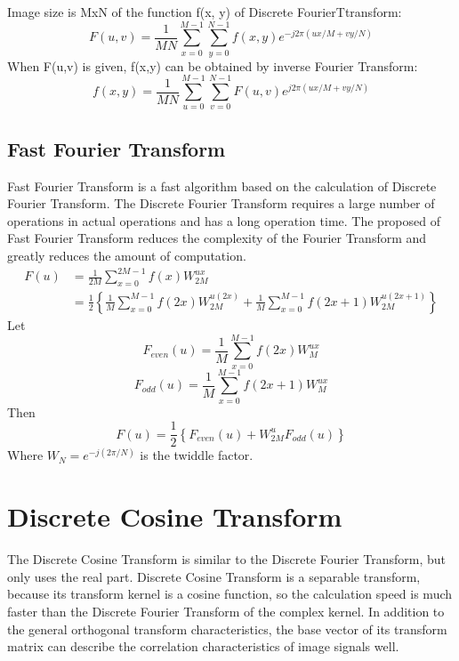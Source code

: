Image size is MxN of the function f(x, y) of Discrete FourierTtransform:
\begin{equation}
F(u,v) = \frac{1}{MN} \sum_{x=0}^{M-1} \sum_{y=0}^{N-1} f(x,y) e^{-j2\pi (ux/M + vy/N)}
\label{eq:2-8}
\end{equation}
When F(u,v) is given, f(x,y) can be obtained by inverse Fourier Transform:
\begin{equation}
f(x,y) = \frac{1}{MN} \sum_{u=0}^{M-1} \sum_{v=0}^{N-1} F(u,v) e^{j2\pi (ux/M + vy/N)}
\label{eq:2-9}
\end{equation}
\subsection{Fast Fourier Transform}
Fast Fourier Transform is a fast algorithm based on the calculation of Discrete Fourier Transform. The Discrete Fourier Transform requires a large number of operations in actual operations and has a long operation time. The proposed of Fast Fourier Transform reduces the complexity of the Fourier Transform and greatly reduces the amount of computation\cite{ref6}. 
\begin{equation}
\begin{aligned}
F(u) &= \frac{1}{2M} \sum_{x=0}^{2M-1} f(x) W_{2M}^{ux} \\
&= \frac{1}{2} \left\{ \frac{1}{M} \sum_{x=0}^{M-1} f(2x) W_{2M}^{u(2x)} + \frac{1}{M} \sum_{x=0}^{M-1} f(2x+1) W_{2M}^{u(2x+1)} \right\}
\end{aligned}
\label{eq:2-10}
\end{equation}
Let
\begin{equation}
F_{even}(u) = \frac{1}{M} \sum_{x=0}^{M-1} f(2x) W_{M}^{ux}
\label{eq:2-11}
\end{equation}
\begin{equation}
F_{odd}(u) = \frac{1}{M} \sum_{x=0}^{M-1} f(2x+1) W_{M}^{ux}
\label{eq:2-12}
\end{equation}
Then
\begin{equation}
F(u) = \frac{1}{2} \left\{ F_{even}(u) + W_{2M}^{u} F_{odd}(u) \right\}     
\label{eq:2-13}
\end{equation}
Where $W_{N} = e^{-j(2\pi/N)}$ is the twiddle factor.

\section{Discrete Cosine Transform}
The Discrete Cosine Transform is similar to the Discrete Fourier Transform, but only uses the real part. Discrete Cosine Transform is a separable transform, because its transform kernel is a cosine function, so the calculation speed is much faster than the Discrete Fourier Transform of the complex kernel. In addition to the general orthogonal transform characteristics, the base vector of its transform matrix can describe the correlation characteristics of image signals well\cite{ref7}.


